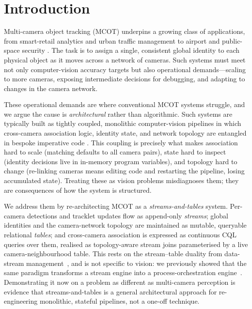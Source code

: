 \documentclass[review]{elsarticle}
\begin{document}
\section{Introduction}
\label{sec:intro}

Multi-camera object tracking (MCOT) underpins a growing class of applications, from smart-retail
analytics and urban traffic management to airport and public-space security
. The task is to assign a single,
consistent global identity to each physical object as it moves across a network of cameras. Such
systems must meet not only computer-vision accuracy targets but also operational
demands---scaling to more cameras, exposing intermediate decisions for debugging, and adapting to
changes in the camera network.

These operational demands are where conventional MCOT systems struggle, and we argue the cause is
\emph{architectural} rather than algorithmic. Such systems are typically built as tightly coupled,
monolithic computer-vision pipelines in which cross-camera association logic, identity state, and
network topology are entangled in bespoke imperative code . This coupling is precisely what makes
association hard to scale (matching defaults to all camera pairs), state hard to inspect (identity
decisions live in in-memory program variables), and topology hard to change (re-linking cameras
means editing code and restarting the pipeline, losing accumulated state). Treating these as
vision problems misdiagnoses them; they are consequences of how the system is structured.

We address them by re-architecting MCOT as a \emph{streams-and-tables} system. Per-camera
detections and tracklet updates flow as append-only \emph{streams}; global identities and the
camera-network topology are maintained as mutable, queryable relational \emph{tables}; and
cross-camera association is expressed as continuous CQL queries over them, realised as
topology-aware stream joins parameterised by a live camera-neighbourhood table. This rests on the
stream--table duality from data-stream management~\cite{sax2018streams,DBLP:conf/dbpl/ArasuBW03},
and is not specific to vision: we previously showed that the same paradigm transforms a stream
engine into a process-orchestration engine~\cite{awad2025best}. Demonstrating it now on a problem
as different as multi-camera perception is evidence that streams-and-tables is a general
architectural approach for re-engineering monolithic, stateful pipelines, not a one-off technique.
\end{document}
